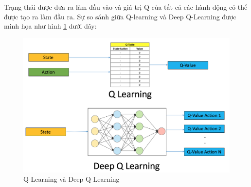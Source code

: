 Trạng thái được đưa ra làm đầu vào và giá trị Q của tất cả các
hành động có thể được tạo ra làm đầu ra. Sự so sánh giữa Q-learning
và Deep Q-Learning được minh họa như hình \ref{fig:dqlearning}
\cite{introductiondeepqlearningpython} dưới đây:

\begin{figure}[ht]
    \centering
    \includegraphics[width=1\textwidth]{thesis/chatbot-outline/kienthucnentang/dqlearning.png}
    \caption{Q-Learning và Deep Q-Learning}
    \label{fig:dqlearning}
\end{figure}
